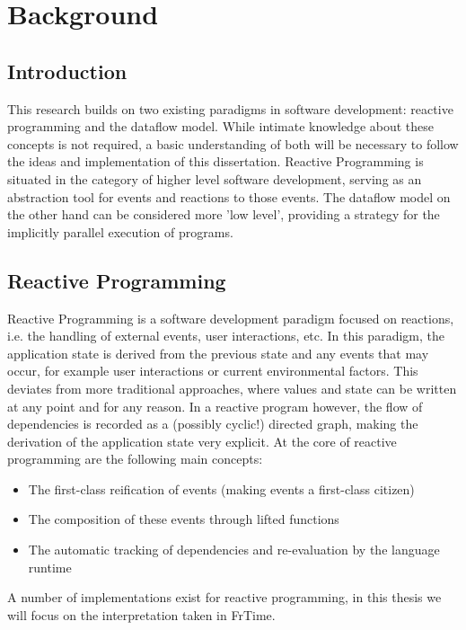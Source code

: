 
\chapter{Background}

\section{Introduction}

This research builds on two existing paradigms in software development: reactive programming and the dataflow model. While intimate knowledge about these concepts is not required, a basic understanding of both will be necessary to follow the ideas and implementation of this dissertation. Reactive Programming is situated in the category of higher level software development, serving as an abstraction tool for events and reactions to those events. The dataflow model on the other hand can be considered more 'low level', providing a strategy for the implicitly parallel execution of programs. 

\newpage

\section{Reactive Programming}

Reactive Programming is a software development paradigm focused on reactions, i.e. the handling of external events, user interactions, etc.  In this paradigm, the application state is derived from the previous state and any events that may occur, for example user interactions or current environmental factors. This deviates from more traditional approaches, where values and state can be written at any point and for any reason. In a reactive program however, the flow of dependencies is recorded as a (possibly cyclic!) directed graph, making the derivation of the application state very explicit.
At the core of reactive programming are the following main concepts:
\begin{itemize}
	\item The first-class reification of events (making events a first-class citizen)
	\item The composition of these events through lifted functions
	\item The automatic tracking of dependencies and re-evaluation by the language runtime
\end{itemize}

A number of implementations exist for reactive programming, in this thesis we will focus on the interpretation taken in FrTime. 

